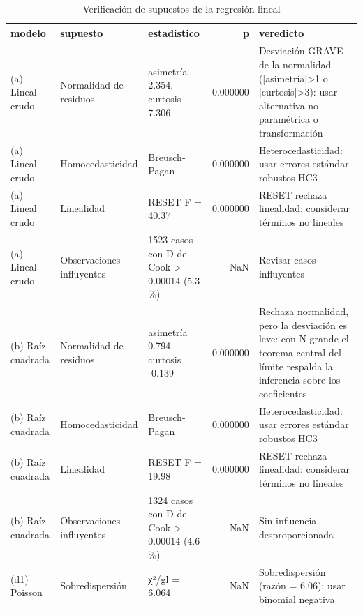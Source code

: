 \begin{table}[htbp]
\caption{Verificación de supuestos de la regresión lineal}
\label{tab:tabla_19_supuestos_regresion}
\begin{tabular}{lllrl}
\toprule
modelo & supuesto & estadistico & p & veredicto \\
\midrule
(a) Lineal crudo & Normalidad de residuos & asimetría 2.354, curtosis 7.306 & 0.000000 & Desviación GRAVE de la normalidad (|asimetría|>1 o |curtosis|>3): usar alternativa no paramétrica o transformación \\
(a) Lineal crudo & Homocedasticidad & Breusch-Pagan & 0.000000 & Heterocedasticidad: usar errores estándar robustos HC3 \\
(a) Lineal crudo & Linealidad & RESET F = 40.37 & 0.000000 & RESET rechaza linealidad: considerar términos no lineales \\
(a) Lineal crudo & Observaciones influyentes & 1523 casos con D de Cook > 0.00014 (5.3 \%) & NaN & Revisar casos influyentes \\
(b) Raíz cuadrada & Normalidad de residuos & asimetría 0.794, curtosis -0.139 & 0.000000 & Rechaza normalidad, pero la desviación es leve: con N grande el teorema central del límite respalda la inferencia sobre los coeficientes \\
(b) Raíz cuadrada & Homocedasticidad & Breusch-Pagan & 0.000000 & Heterocedasticidad: usar errores estándar robustos HC3 \\
(b) Raíz cuadrada & Linealidad & RESET F = 19.98 & 0.000000 & RESET rechaza linealidad: considerar términos no lineales \\
(b) Raíz cuadrada & Observaciones influyentes & 1324 casos con D de Cook > 0.00014 (4.6 \%) & NaN & Sin influencia desproporcionada \\
(d1) Poisson & Sobredispersión & χ²/gl = 6.064 & NaN & Sobredispersión (razón = 6.06): usar binomial negativa \\
\bottomrule
\end{tabular}
\end{table}
